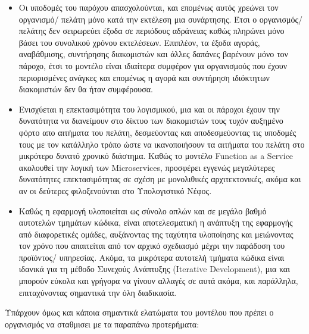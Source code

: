 \documentclass{article}
\begin{document}
\begin{itemize}
\item Οι υποδομές του παρόχου απασχολούνται, και επομένως αυτός χρεώνει τον οργανισμό/ πελάτη μόνο κατά την εκτέλεση μια συνάρτησης. Έτσι ο οργανισμός/ πελάτης δεν σειρωρεύει έξοδα σε περιόδους αδράνειας καθώς πληρώνει μόνο βάσει του συνολικού χρόνου εκτελέσεων. Επιπλέον, τα έξοδα αγοράς, αναβάθμισης, συντήρησης διακομιστών και άλλες δαπάνες βαρένουν μόνο τον πάροχο, έτσι το μοντέλο είναι ιδιαίτερα συμφέρον για οργανισμούς που έχουν περιορισμένες ανάγκες και επομένως η αγορά και συντήρηση ιδιόκτητων διακομιστών δεν θα ήταν συμφέρουσα.
\item Ενισχύεται η επεκτασιμότητα του λογισμικού, μια και οι πάροχοι έχουν την δυνατότητα να διανείμουν στο δίκτυο των διακομιστών τους τυχόν αυξημένο φόρτο απο αιτήματα του πελάτη, δεσμεύοντας και αποδεσμεύοντας τις υποδομές τους με τον κατάλληλο τρόπο ώστε να ικανοποιήσουν τα αιτήματα του πελάτη στο μικρότερο δυνατό χρονικό διάστημα. Καθώς το μοντέλο Function as a Service ακολουθεί την λογική των  Microservices, προσφέρει εγγενώς μεγαλύτερες δυνατότητες επεκτασιμότητας σε σχέση με μονολιθικές αρχιτεκτονικές, ακόμα και αν οι δεύτερες φιλοξενούνται στο Υπολογιστικό Νέφος.
\item Καθώς η εφαρμογή υλοποιείται ως σύνολο απλών και σε μεγάλο βαθμό αυτοτελών τμημάτων κώδικα, είναι αποτελεσματική η ανάπτυξη της εφαρμογής από διαφορετικές ομάδες, αυξάνοντας της ταχύτητα υλοποίησης και μειώνοντας τον χρόνο που απαιτείται από τον αρχικό σχεδιασμό μέχρι την παράδοση του προϊόντος/ υπηρεσίας. Ακόμα, τα μικρότερα αυτοτελή τμήματα κώδικα είναι ιδανικά για τη μέθοδο Συνεχούς Ανάπτυξης (Iterative Development), μια και μπορούν εύκολα και γρήγορα να γίνουν αλλαγές σε αυτά ακόμα, και παράλληλα, επιταχύνοντας σημαντικά την όλη διαδικασία.
\end{itemize}

Υπάρχουν όμως και κάποια σημαντικά ελατώματα του μοντέλου που πρέπει ο οργανισμός να σταθμισει με τα παραπάνω προτερήματα:
\end{document}

